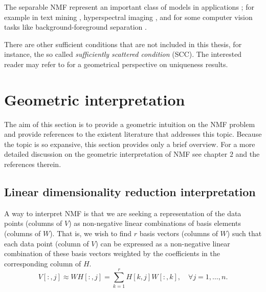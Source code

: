 The separable NMF represent an important class of models in applications \cite{gillis2013fast}; for example in text mining \cite{arora2013practical}, 
hyperspectral imaging \cite{boardman1995mapping}, and for some computer vision tasks like background-foreground separation \cite{kumar2015near}.
\par
There are other sufficient conditions that are not included in this thesis, for instance, the so called \textit{sufficiently scattered condition} (SCC). The interested reader may refer to \cite{huang2013non} for a geometrical perspective on uniqueness results.

\section{Geometric interpretation}\label{Geometric interpretation section}
The aim of this section is to provide a geometric intuition on the NMF problem and provide references to the existent literature that addresses this topic.
Because the topic is so expansive, this section provides only a brief overview. For a more detailed discussion on the geometric interpretation of NMF see \cite{gillis2020nonnegative} chapter $2$ and the references therein.
\subsection{Linear dimensionality reduction interpretation}
A way to interpret NMF is that we are seeking a representation of the data points (columns of $V$) as non-negative linear combinations of basis elements (columns of $W$).
That is, we wish to find $r$ basis vectors (columns of $W$) such that each data point (column of $V$) can be expressed as a non-negative linear combination of these basis vectors weighted by the coefficients in the corresponding column of $H$.
\begin{equation}
    V[:,j] \approx WH[:,j] = \sum_{k=1}^{r} H[k,j] W[:, k], \quad \forall j = 1, \ldots, n.
\end{equation}

